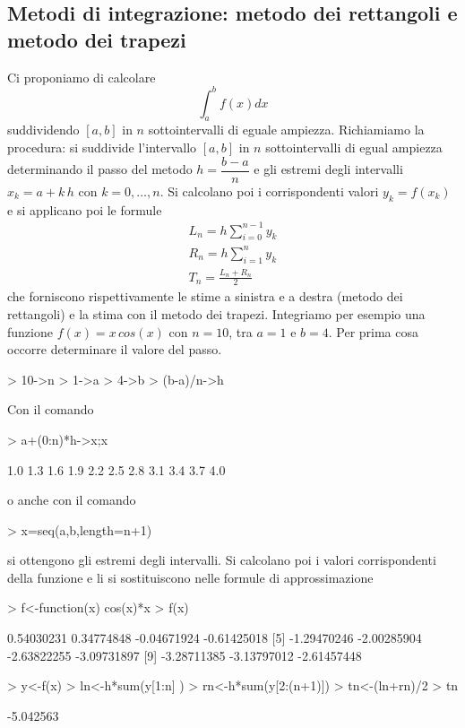 \documentclass[onecolumn,11pt]{book}
\begin{document}
\subsection{Metodi di integrazione: metodo dei rettangoli e metodo dei trapezi}
Ci proponiamo di calcolare $$\int_a^b f(x)dx$$ suddividendo $[a,b]$ in $n$ sottointervalli di eguale ampiezza. Richiamiamo la procedura:  si suddivide l'intervallo $[a,b]$ in $n$ sottointervalli di egual ampiezza determinando il passo del metodo
$h=\dfrac{b-a}{n}$
e gli estremi degli intervalli 
$x_k=a+ k\, h$ con $k=0,\ldots,n$. Si calcolano poi i corrispondenti valori  $y_k=f(x_k)$ e si applicano poi le formule
\begin{eqnarray*}
L_n=h \sum_{i=0}^{n-1} y_k\\
R_n=h \sum_{i=1}^{n} y_k\\
T_n=\frac{L_n+R_n}{2}\end{eqnarray*}
che forniscono rispettivamente le stime a sinistra e a destra (metodo dei rettangoli) e la stima con il metodo dei trapezi.
Integriamo per esempio  una funzione $f(x)=x\, cos(x)$ con $n=10$, tra $a=1$ e $b=4$. Per prima cosa occorre determinare  il valore del passo.
\begin{Schunk}
\begin{Sinput}
> 10->n
> 1->a
> 4->b
> (b-a)/n->h
\end{Sinput}
\end{Schunk}
Con il comando   
\begin{Schunk}
\begin{Sinput}
> a+(0:n)*h->x;x
\end{Sinput}
\begin{Soutput}
 [1] 1.0 1.3 1.6 1.9 2.2 2.5 2.8 3.1 3.4 3.7 4.0
\end{Soutput}
\end{Schunk}
o anche con il comando
\begin{Schunk}
\begin{Sinput}
> x=seq(a,b,length=n+1)
\end{Sinput}
\end{Schunk}
si ottengono gli estremi degli intervalli. Si calcolano poi i valori corrispondenti della funzione e li si sostituiscono nelle formule di approssimazione
\begin{Schunk}
\begin{Sinput}
> f<-function(x) cos(x)*x
> f(x)
\end{Sinput}
\begin{Soutput}
 [1]  0.54030231  0.34774848 -0.04671924 -0.61425018
 [5] -1.29470246 -2.00285904 -2.63822255 -3.09731897
 [9] -3.28711385 -3.13797012 -2.61457448
\end{Soutput}
\begin{Sinput}
> y<-f(x)
> ln<-h*sum(y[1:n] )
> rn<-h*sum(y[2:(n+1)])
> tn<-(ln+rn)/2
> tn
\end{Sinput}
\begin{Soutput}
[1] -5.042563
\end{Soutput}
\end{Schunk}
\end{document}

